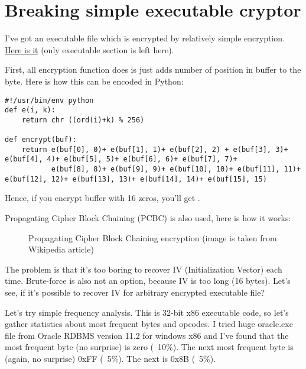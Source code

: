 \section{Breaking simple executable cryptor}

I've got an executable file which is encrypted by relatively simple encryption.
\href{https://github.com/dennis714/yurichev.com/blob/master/blog/breaking_simple_exec_crypto/files/cipher.bin}{Here is it} (only executable section is left here).

First, all encryption function does is just adds number of position in buffer to the byte.
Here is how this can be encoded in Python:

\begin{lstlisting}[caption=Python script]
#!/usr/bin/env python
def e(i, k):
    return chr ((ord(i)+k) % 256)

def encrypt(buf):
    return e(buf[0], 0)+ e(buf[1], 1)+ e(buf[2], 2) + e(buf[3], 3)+ e(buf[4], 4)+ e(buf[5], 5)+ e(buf[6], 6)+ e(buf[7], 7)+
           e(buf[8], 8)+ e(buf[9], 9)+ e(buf[10], 10)+ e(buf[11], 11)+ e(buf[12], 12)+ e(buf[13], 13)+ e(buf[14], 14)+ e(buf[15], 15)
\end{lstlisting}

Hence, if you encrypt buffer with 16 zeros, you'll get .

Propagating Cipher Block Chaining (PCBC) is also used, here is how it works:

\begin{figure}[H]
\centering
{}
\caption{Propagating Cipher Block Chaining encryption (image is taken from Wikipedia article)}
\end{figure}

The problem is that it's too boring to recover IV (Initialization Vector) each time.
Brute-force is also not an option, because IV is too long (16 bytes).
Let's see, if it's possible to recover IV for arbitrary encrypted executable file?

Let's try simple frequency analysis.
This is 32-bit x86 executable code, so let's gather statistics about most frequent bytes and opcodes.
I tried huge oracle.exe file from Oracle RDBMS version 11.2 for windows x86 and I've found that the most frequent byte (no surprise) is zero (~10\%).
The next most frequent byte is (again, no surprise) 0xFF (~5\%).
The next is 0x8B (~5\%).


